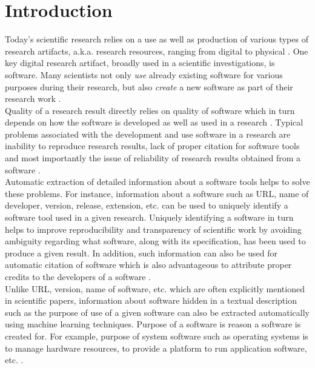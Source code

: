 \chapter{Introduction}
\label{ch:intro}

Today’s scientific research relies on a use as well as production of various types of research artifacts, a.k.a. research resources, ranging from digital to physical \citep{schindler2019annotation}. One key digital research artifact, broadly used in a scientific investigations, is software. Many scientists not only \emph{use} already existing software for various purposes during their research, but also \emph{create} a new software as part of their research work \citep{goble2014better, hannay2009scientists}. \\


Quality of a research result directly relies on quality of software which in turn depends on  how the software is developed as well as used in a research \citep{hannay2009scientists}. Typical problems associated with the development and use software in a research are inability to reproduce research results, lack of proper citation for software tools and most importantly the issue of reliability of research results obtained from a software \citep{schindler2021somesci, baker2016reproducibility, soergel2014rampant}. \\


Automatic extraction of detailed information about a software tools helps to solve these problems. For instance, information about a software such as \ac{URL}, name of developer, version, release, extension, etc. can be used to uniquely identify a software tool used in a given research. Uniquely identifying a software in turn helps to improve reproducibility and transparency of scientific work by avoiding ambiguity regarding what software, along with its specification,  has been used to produce a given result. In addition, such information can also be used for automatic citation of software which is also advantageous to attribute proper credits to the developers of a software \citep{kruger2019literature}. \\


Unlike \ac{URL}, version, name of software, etc. which are often explicitly mentioned in scientific papers, information about software hidden in a textual description such as the purpose of use of a given software can also be extracted automatically using machine learning techniques. Purpose of a software is reason a software is created for. For example, purpose of system software such as operating systems is to manage hardware resources, to provide a platform to run application software, etc. \citep{enwiki:1076010620}. \\


